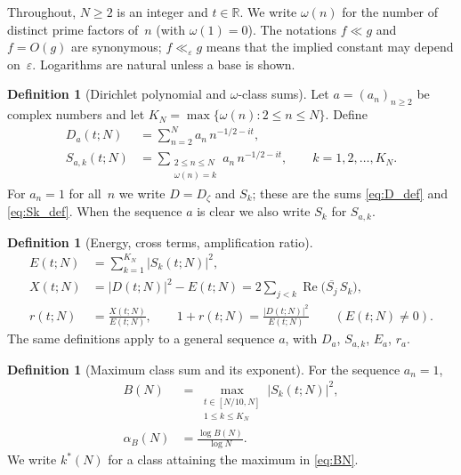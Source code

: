 \documentclass[11pt]{amsart}
\theoremstyle{definition}
\newtheorem{definition}[theorem]{Definition}
\theoremstyle{remark}
\newcommand{\R}{\mathbb{R}}
\newcommand{\re}{\operatorname{Re}}
\begin{document}
Throughout, $N \ge 2$ is an integer and $t \in \R$.
We write $\omega(n)$ for the number of distinct prime factors of~$n$
(with $\omega(1) = 0$).  The notations $f \ll g$ and $f = O(g)$ are
synonymous; $f \ll_\varepsilon g$ means that the implied constant may
depend on~$\varepsilon$.  Logarithms are natural unless a base is shown.

\begin{definition}[Dirichlet polynomial and $\omega$-class sums]
\label{def:D_and_Sk}
Let $a=(a_n)_{n\ge2}$ be complex numbers and let
$K_N=\max\{\omega(n):2\le n\le N\}$.  Define
\begin{align}
  D_a(t;N) &= \sum_{n=2}^{N} a_n \, n^{-1/2-it}, \label{eq:DF}\\
  S_{a,k}(t;N) &= \sum_{\substack{2\le n \le N \\ \omega(n) = k}}
    a_n \, n^{-1/2-it}, \qquad k = 1, 2, \ldots, K_N. \label{eq:SkF}
\end{align}
For $a_n = 1$ for all~$n$ we write $D=D_\zeta$ and $S_k$; these are the
sums \eqref{eq:D_def} and \eqref{eq:Sk_def}.  When the sequence $a$ is
clear we also write $S_k$ for $S_{a,k}$.
\end{definition}

\begin{definition}[Energy, cross terms, amplification ratio]
\label{def:energy}
\begin{align}
  E(t;N) &= \sum_{k=1}^{K_N} |S_k(t;N)|^2, \label{eq:E}\\
  X(t;N) &= |D(t;N)|^2 - E(t;N)
    = 2 \sum_{j < k} \re\bigl(\overline{S_j} \, S_k\bigr), \label{eq:X}\\
  r(t;N) &= \frac{X(t;N)}{E(t;N)}, \qquad
  1 + r(t;N) = \frac{|D(t;N)|^2}{E(t;N)}\qquad(E(t;N)\ne0). \label{eq:r}
\end{align}
The same definitions apply to a general sequence $a$, with $D_a$,
$S_{a,k}$, $E_a$, $r_a$.
\end{definition}

\begin{definition}[Maximum class sum and its exponent]
\label{def:BN}
For the sequence $a_n=1$,
\begin{align}
  B(N) &= \max_{\substack{t \in [N/10, N] \\
    1 \le k \le K_N}} |S_k(t;N)|^2, \label{eq:BN}\\
  \alpha_B(N) &= \frac{\log B(N)}{\log N}. \label{eq:alphaB}
\end{align}
We write $k^*(N)$ for a class attaining the maximum in \eqref{eq:BN}.
\end{definition}
\end{document}

